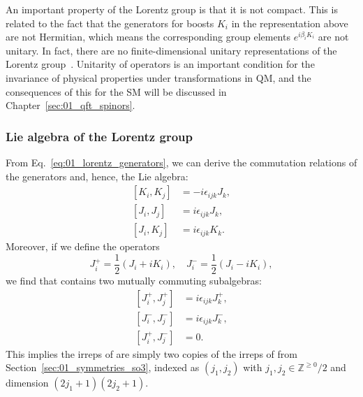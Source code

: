 An important property of the Lorentz group is that it is not compact.
This is related to the fact that the generators for boosts $K_i$ in the representation above are not Hermitian, which means the corresponding group elements $e^{i\beta_i K_i}$ are not unitary.
In fact, there are no finite-dimensional unitary representations of the Lorentz group~\cite{Wigner:1939cj}.
Unitarity of operators is an important condition for the invariance of physical properties under transformations in QM, and the consequences of this for the SM will be discussed in Chapter~\ref{sec:01_qft_spinors}.

\subsubsection{Lie algebra of the Lorentz group}

From Eq.~\ref{eq:01_lorentz_generators}, we can derive the commutation relations of the generators and, hence, the Lie algebra:
\begin{equation}
	\begin{split}
		\label{eq:01_lorentz_algebra}
		[K_i, K_j] &= -i \epsilon_{ijk} J_k, \\
		 [J_i, J_j] &= i \epsilon_{ijk} J_k, \\
		[J_i, K_j] &= i \epsilon_{ijk} K_k.
	\end{split}
\end{equation}
Moreover, if we define the operators
\begin{equation}
	\label{eq:01_lorentz_su2_operators}
	J^+_i = \frac{1}{2}(J_i + iK_i), \quad J^-_i = \frac{1}{2}(J_i - iK_i),
\end{equation}
we find that \so[1, 3] contains two mutually commuting \su[2] subalgebras:
\begin{equation}
	\begin{split}
		\label{eq:01_lorentz_su2_subalgebras}
		[J^+_i, J^+_j] &= i \epsilon_{ijk} J^+_k, \\
		[J^-_i, J^-_j] &= i \epsilon_{ijk} J^-_k, \\
		[J^+_i, J^-_j] &= 0.
	\end{split}
\end{equation}
This implies the irreps of \so[1, 3] are simply two copies of the irreps of \su[2] from Section~\ref{sec:01_symmetries_so3}, indexed as $(j_1, j_2)$ with $j_1, j_2 \in \mathbb Z^{\geq0}/2$ and dimension $(2j_1 + 1)(2j_2 + 1)$.

